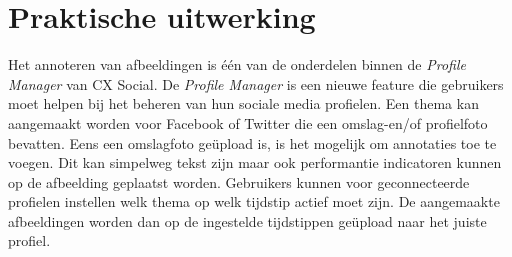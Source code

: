 
\chapter{Praktische uitwerking}
\vspace{-3cm}
Het annoteren van afbeeldingen is \'{e}\'{e}n van de onderdelen binnen de \textit{Profile Manager} van CX Social. De \textit{Profile Manager} is een nieuwe feature die gebruikers moet helpen bij het beheren van hun sociale media profielen. Een thema kan aangemaakt worden voor Facebook of Twitter die een omslag-en/of profielfoto bevatten. Eens een omslagfoto ge\"{u}pload is, is het mogelijk om annotaties toe te voegen. Dit kan simpelweg tekst zijn maar ook performantie indicatoren kunnen op de afbeelding geplaatst worden. Gebruikers kunnen voor geconnecteerde profielen instellen welk thema op welk tijdstip actief moet zijn. De aangemaakte afbeeldingen worden dan op de ingestelde tijdstippen ge\"{u}pload naar het juiste profiel. 


